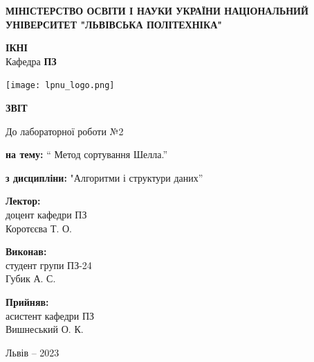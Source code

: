 \documentclass[12pt]{extarticle}
\begin{document}
\begin{titlepage}
    \begin{center}
        \textbf{\normalsize{\MakeUppercase{
            Міністерство Освіти і науки України
            Національний університет "Львівська політехніка"
        }}}

        \begin{flushright}
        \textbf{ІКНІ}\\
        Кафедра \textbf{ПЗ}
        \end{flushright}
        \vspace{15mm}

        \texttt{[image: lpnu\_logo.png]}

        \vspace*{\fill}

        \textbf{\normalsize{\MakeUppercase{Звіт}}}
            
        До лабораторної роботи №2

        \textbf{на тему:} “ Метод сортування Шелла.”

        \textbf{з дисципліни:} "Алгоритми і структури даних”
            
        \vspace*{\fill}

        \begin{flushright}

            \textbf{Лектор:}\\
            доцент кафедри ПЗ\\
            Коротєєва Т. О.\\
            \vspace{12pt}

            \textbf{Виконав:}\\
            студент групи ПЗ-24\\
            Губик А. С.\\
            \vspace{12pt}

            \textbf{Прийняв:}\\
            асистент кафедри ПЗ\\
            Вишнеський О. К.\\
        \vspace{12pt}
        \end{flushright}

        Львів -- 2023
            
            
    \end{center}
\end{titlepage}
\end{document}
